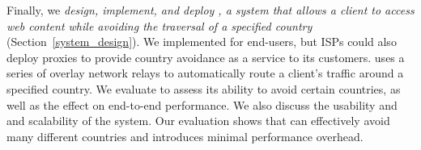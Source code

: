 Finally, we {\em design, implement, and deploy \system{}, a system that allows
a client to access web content while avoiding the traversal of a specified
country} (Section~\ref{system_design}).  We implemented \system{} for
end-users, 
but ISPs could also deploy \system{} proxies to provide country
avoidance as a service to its customers.  \system{} uses a series of overlay
network relays to automatically route a client's traffic around a specified
country.  We evaluate \system{} to assess its ability to avoid certain
countries, as well as the effect on end-to-end performance. We
also discuss the usability and and scalability of the system.  Our evaluation
shows that \system{} can effectively avoid many different countries and
introduces minimal performance overhead. 
